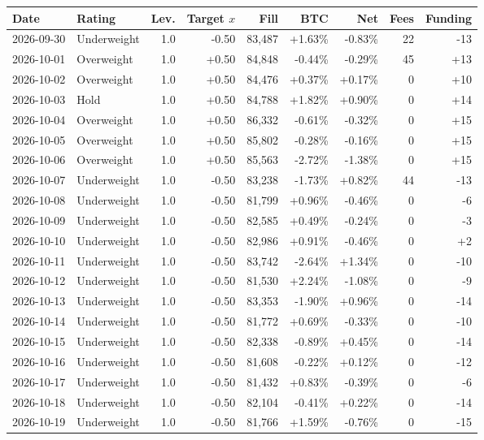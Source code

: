 \begin{longtable}{llrrrrrrr}
\toprule
Date & Rating & Lev. & Target $x$ & Fill & BTC & Net & Fees & Funding \\
\midrule
\endhead
2026-09-30 & Underweight & 1.0 & -0.50 & 83,487 & +1.63\% & -0.83\% & 22 & -13 \\
2026-10-01 & Overweight & 1.0 & +0.50 & 84,848 & -0.44\% & -0.29\% & 45 & +13 \\
2026-10-02 & Overweight & 1.0 & +0.50 & 84,476 & +0.37\% & +0.17\% & 0 & +10 \\
2026-10-03 & Hold & 1.0 & +0.50 & 84,788 & +1.82\% & +0.90\% & 0 & +14 \\
2026-10-04 & Overweight & 1.0 & +0.50 & 86,332 & -0.61\% & -0.32\% & 0 & +15 \\
2026-10-05 & Overweight & 1.0 & +0.50 & 85,802 & -0.28\% & -0.16\% & 0 & +15 \\
2026-10-06 & Overweight & 1.0 & +0.50 & 85,563 & -2.72\% & -1.38\% & 0 & +15 \\
2026-10-07 & Underweight & 1.0 & -0.50 & 83,238 & -1.73\% & +0.82\% & 44 & -13 \\
2026-10-08 & Underweight & 1.0 & -0.50 & 81,799 & +0.96\% & -0.46\% & 0 & -6 \\
2026-10-09 & Underweight & 1.0 & -0.50 & 82,585 & +0.49\% & -0.24\% & 0 & -3 \\
2026-10-10 & Underweight & 1.0 & -0.50 & 82,986 & +0.91\% & -0.46\% & 0 & +2 \\
2026-10-11 & Underweight & 1.0 & -0.50 & 83,742 & -2.64\% & +1.34\% & 0 & -10 \\
2026-10-12 & Underweight & 1.0 & -0.50 & 81,530 & +2.24\% & -1.08\% & 0 & -9 \\
2026-10-13 & Underweight & 1.0 & -0.50 & 83,353 & -1.90\% & +0.96\% & 0 & -14 \\
2026-10-14 & Underweight & 1.0 & -0.50 & 81,772 & +0.69\% & -0.33\% & 0 & -10 \\
2026-10-15 & Underweight & 1.0 & -0.50 & 82,338 & -0.89\% & +0.45\% & 0 & -14 \\
2026-10-16 & Underweight & 1.0 & -0.50 & 81,608 & -0.22\% & +0.12\% & 0 & -12 \\
2026-10-17 & Underweight & 1.0 & -0.50 & 81,432 & +0.83\% & -0.39\% & 0 & -6 \\
2026-10-18 & Underweight & 1.0 & -0.50 & 82,104 & -0.41\% & +0.22\% & 0 & -14 \\
2026-10-19 & Underweight & 1.0 & -0.50 & 81,766 & +1.59\% & -0.76\% & 0 & -15 \\

\end{longtable}
